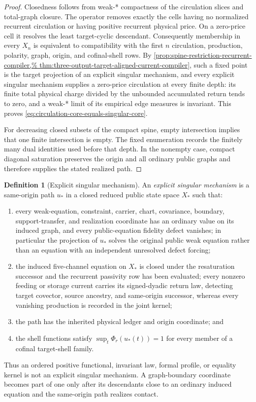 \documentclass[11pt]{article}
\numberwithin{section}{part}
\theoremstyle{plain}
\theoremstyle{definition}
\newtheorem{definition}[definition]{Definition}
\theoremstyle{remark}
\begin{document}
\begin{proof}
Closedness follows from weak-* compactness of the circulation slices and
total-graph closure.  The operator removes exactly the cells having no
normalized recurrent circulation or having positive recurrent physical
price.  On a zero-price cell it resolves the least target-cyclic descendant.
Consequently membership in every \(X_n\) is equivalent to compatibility with
the first \(n\) circulation, production, polarity, graph, origin, and
cofinal-shell rows.  By
\cref{prop:spine-restriction-recurrent-compiler,%
thm:three-output-target-aligned-current-compiler}, such a fixed point is the
target projection of an explicit singular mechanism, and every explicit
singular mechanism supplies a zero-price circulation at every finite depth:
its finite total physical charge divided by the unbounded accumulated return
tends to zero, and a weak-* limit of its empirical edge measures is invariant.
This proves \eqref{eq:circulation-core-equals-singular-core}.

For decreasing closed subsets of the compact spine, empty intersection
implies that one finite intersection is empty.  The fixed enumeration records
the finitely many dual identities used before that depth.  In the nonempty
case, compact diagonal saturation preserves the origin and all ordinary
public graphs and therefore supplies the stated realized path.
\end{proof}

\begin{definition}[Explicit singular mechanism]
\label{def:explicit-singular-mechanism}
An \emph{explicit singular mechanism} is a same-origin path \(u_\ast\) in a
closed reduced public state space \(X_\ast\) such that:
\begin{enumerate}[label=\textup{(E\arabic*)}]
\item every weak-equation, constraint, carrier, chart, covariance, boundary,
support-transfer, and realization coordinate has an ordinary value on its
induced graph, and every public-equation fidelity defect vanishes; in
particular the projection of \(u_\ast\) solves the original public weak
equation rather than an equation with an independent unresolved defect
forcing;
\item the induced five-channel equation on \(X_\ast\) is closed under the
resaturation successor and the recurrent passivity row has been evaluated;
every nonzero feeding or storage current carries its signed-dyadic return
law, detecting target covector, source ancestry, and same-origin successor,
whereas every vanishing production is recorded in the joint kernel;
\item the path has the inherited physical ledger and origin coordinate; and
\item the shell functions satisfy
\(\sup_t\Phi_r(u_\ast(t))=1\) for every member of a cofinal target-shell
family.
\end{enumerate}
Thus an ordered positive functional, invariant law, formal profile, or
equality kernel is not an explicit singular mechanism.  A graph-boundary
coordinate becomes part of one only after its descendants close to an
ordinary induced equation and the same-origin path realizes contact.
\end{definition}
\end{document}
